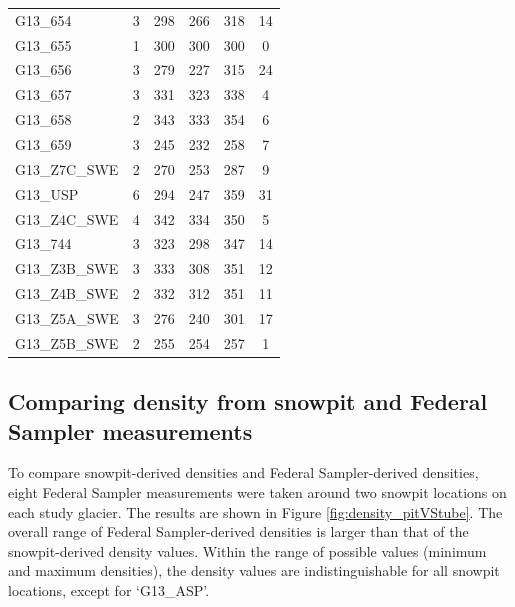 \documentclass[12pt]{article}
\begin{document}
\begin{table}[]
\begin{tabular}{lccccc}
G13\_654 & 3 & 298 & 266 & 318 & 14 \\
G13\_655 & 1 & 300 & 300 & 300 & 0 \\
G13\_656 & 3 & 279 & 227 & 315 & 24 \\
G13\_657 & 3 & 331 & 323 & 338 & 4 \\
G13\_658 & 2 & 343 & 333 & 354 & 6 \\
G13\_659 & 3 & 245 & 232 & 258 & 7 \\
G13\_Z7C\_SWE & 2 & 270 & 253 & 287 & 9 \\
G13\_USP & 6 & 294 & 247 & 359 & 31 \\
G13\_Z4C\_SWE & 4 & 342 & 334 & 350 & 5 \\
G13\_744 & 3 & 323 & 298 & 347 & 14 \\
G13\_Z3B\_SWE & 3 & 333 & 308 & 351 & 12 \\
G13\_Z4B\_SWE & 2 & 332 & 312 & 351 & 11 \\
G13\_Z5A\_SWE & 3 & 276 & 240 & 301 & 17 \\
G13\_Z5B\_SWE & 2 & 255 & 254 & 257 & 1
\end{tabular}
\end{table}

\subsection{Comparing density from snowpit and Federal Sampler measurements}

To compare snowpit-derived densities and Federal Sampler-derived densities, eight Federal Sampler measurements were taken around two snowpit locations on each study glacier. The results are shown in Figure \ref{fig:density_pitVStube}. The overall range of Federal Sampler-derived densities is larger than that of the snowpit-derived density values. Within the range of possible values (minimum and maximum densities), the density values are indistinguishable for all snowpit locations, except for `G13\_ASP'.
\end{document}
